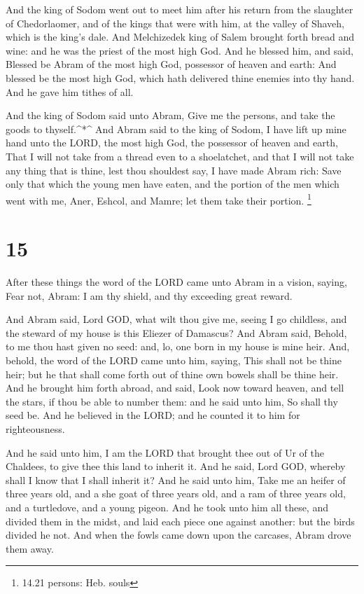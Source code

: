  And the king of Sodom went out to meet him after his
return from the slaughter of Chedorlaomer, and of the kings that were
with him, at the valley of Shaveh, which is the king's dale.
 And Melchizedek king of Salem brought forth bread and
wine: and he was the priest of the most high God.  And he
blessed him, and said, Blessed be Abram of the most high God, possessor
of heaven and earth:  And blessed be the most high God,
which hath delivered thine enemies into thy hand. And he gave him tithes
of all.

 And the king of Sodom said unto Abram, Give me the
persons, and take the goods to thyself.\^{}*\^{}  And Abram
said to the king of Sodom, I have lift up mine hand unto the LORD, the
most high God, the possessor of heaven and earth,  That I
will not take from a thread even to a shoelatchet, and that I will not
take any thing that is thine, lest thou shouldest say, I have made Abram
rich:  Save only that which the young men have eaten, and
the portion of the men which went with me, Aner, Eshcol, and Mamre; let
them take their portion. \footnote{14.21 persons: Heb. souls}

\hypertarget{section-14}{%
\section{15}\label{section-14}}

 After these things the word of the LORD came unto Abram in
a vision, saying, Fear not, Abram: I am thy shield, and thy exceeding
great reward.

 And Abram said, Lord GOD, what wilt thou give me, seeing I
go childless, and the steward of my house is this Eliezer of Damascus?
 And Abram said, Behold, to me thou hast given no seed: and,
lo, one born in my house is mine heir.  And, behold, the
word of the LORD came unto him, saying, This shall not be thine heir;
but he that shall come forth out of thine own bowels shall be thine
heir.  And he brought him forth abroad, and said, Look now
toward heaven, and tell the stars, if thou be able to number them: and
he said unto him, So shall thy seed be.  And he believed in
the LORD; and he counted it to him for righteousness.

 And he said unto him, I am the LORD that brought thee out
of Ur of the Chaldees, to give thee this land to inherit it.
 And he said, Lord GOD, whereby shall I know that I shall
inherit it?  And he said unto him, Take me an heifer of
three years old, and a she goat of three years old, and a ram of three
years old, and a turtledove, and a young pigeon.  And he
took unto him all these, and divided them in the midst, and laid each
piece one against another: but the birds divided he not. 
And when the fowls came down upon the carcases, Abram drove them away.

